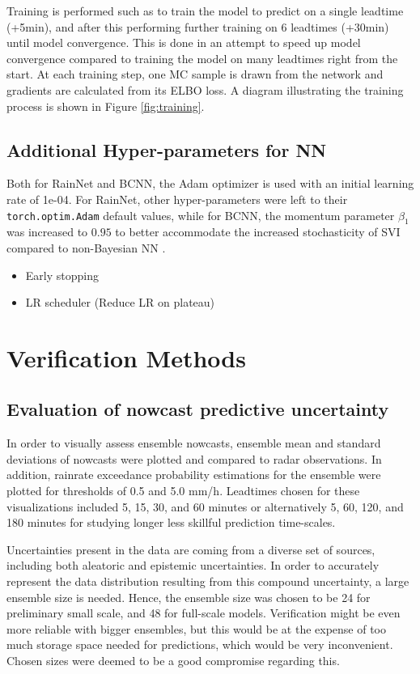 Training is performed such as to train the model to predict on a single leadtime (+5min), and after this performing further training on 6 leadtimes (+30min) until model convergence. This is done in an attempt to speed up model convergence compared to training the model on many leadtimes right from the start. At each training step, one MC sample is drawn from the network and gradients are calculated from its ELBO loss. A diagram illustrating the training process is shown in Figure \ref{fig:training}.

\subsection{Additional Hyper-parameters for NN}
\label{section:hyper}
 Both for RainNet and BCNN, the Adam optimizer is used with an initial learning rate of 1e-04. For RainNet, other hyper-parameters were left to their \texttt{torch.optim.Adam} default values, while for BCNN, the momentum parameter $\beta_1$ was increased to $0.95$ to better accommodate the increased stochasticity of SVI compared to non-Bayesian NN \cite{noauthor_svi_nodate}. 
 
 
 \begin{itemize}
 	\item Early stopping
	\item LR scheduler (Reduce LR on plateau)
 \end{itemize}


\section{Verification Methods}


\subsection{Evaluation of nowcast predictive uncertainty}


In order to visually assess ensemble nowcasts, ensemble mean and standard deviations of nowcasts were plotted and compared to radar observations. In addition, rainrate exceedance probability estimations for the ensemble were plotted for thresholds of 0.5 and 5.0 mm/h. Leadtimes chosen for these visualizations included 5, 15, 30, and 60 minutes or alternatively 5, 60, 120, and 180 minutes for studying longer less skillful prediction time-scales.

Uncertainties present in the data are coming from a diverse set of sources, including both aleatoric and epistemic uncertainties. In order to accurately represent the data distribution resulting from this compound uncertainty, a large ensemble size is needed. Hence, the ensemble size was chosen to be 24 for preliminary small scale, and 48 for full-scale models. Verification might be even more reliable with bigger ensembles, but this would be at the expense of too much storage space needed for predictions, which would be very inconvenient. Chosen sizes were deemed to be a good compromise regarding this.



